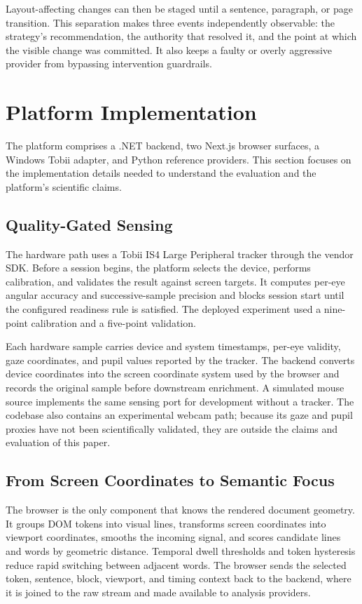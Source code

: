 \documentclass[sigconf,review,anonymous]{acmart}
\begin{document}
Layout-affecting changes can then be staged until a sentence, paragraph, or page transition.
This separation makes three events independently observable: the strategy's recommendation, the authority that resolved it, and the point at which the visible change was committed.
It also keeps a faulty or overly aggressive provider from bypassing intervention guardrails.

\section{Platform Implementation}

The platform comprises a .NET backend, two Next.js browser surfaces, a Windows Tobii adapter, and Python reference providers.
This section focuses on the implementation details needed to understand the evaluation and the platform's scientific claims.

\subsection{Quality-Gated Sensing}

The hardware path uses a Tobii IS4 Large Peripheral tracker through the vendor SDK.
Before a session begins, the platform selects the device, performs calibration, and validates the result against screen targets.
It computes per-eye angular accuracy and successive-sample precision and blocks session start until the configured readiness rule is satisfied.
The deployed experiment used a nine-point calibration and a five-point validation.

Each hardware sample carries device and system timestamps, per-eye validity, gaze coordinates, and pupil values reported by the tracker.
The backend converts device coordinates into the screen coordinate system used by the browser and records the original sample before downstream enrichment.
A simulated mouse source implements the same sensing port for development without a tracker.
The codebase also contains an experimental webcam path; because its gaze and pupil proxies have not been scientifically validated, they are outside the claims and evaluation of this paper.

\subsection{From Screen Coordinates to Semantic Focus}

The browser is the only component that knows the rendered document geometry.
It groups DOM tokens into visual lines, transforms screen coordinates into viewport coordinates, smooths the incoming signal, and scores candidate lines and words by geometric distance.
Temporal dwell thresholds and token hysteresis reduce rapid switching between adjacent words.
The browser sends the selected token, sentence, block, viewport, and timing context back to the backend, where it is joined to the raw stream and made available to analysis providers.
\end{document}
